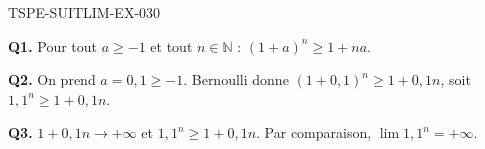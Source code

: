 \begin{corrige}{TSPE-SUITLIM-EX-030}

\textbf{Q1.} Pour tout $a \geq -1$ et tout $n \in \mathbb{N}$ : $(1+a)^n \geq 1+na$.

\textbf{Q2.} On prend $a = 0{,}1 \geq -1$. Bernoulli donne $(1+0{,}1)^n \geq 1+0{,}1n$, soit $1{,}1^n \geq 1+0{,}1n$.

\textbf{Q3.} $1+0{,}1n \to +\infty$ et $1{,}1^n \geq 1+0{,}1n$. Par comparaison, $\boxed{\lim 1{,}1^n = +\infty}$.

\end{corrige}
